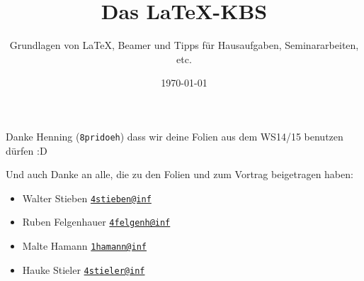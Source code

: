 \documentclass{beamer}
\title{Das \LaTeX-KBS}
\subtitle{\small Grundlagen von \LaTeX, Beamer und Tipps für Hausaufgaben, Seminararbeiten, etc.}
\date{\footnotesize \today}
\begin{document}
	\maketitle
		
		
	\begin{frame}
		\begin{center}
			Danke Henning (\texttt{8pridoeh}) dass wir deine Folien aus dem WS14/15 benutzen dürfen :D
		\end{center}
		Und auch Danke an alle, die zu den Folien und zum Vortrag beigetragen haben:
		\begin{itemize}
			\item Walter Stieben \texttt{\href{mailto:4stieben@informatik.uni-hamburg.de}{4stieben@inf}}\\
			\item Ruben Felgenhauer \texttt{\href{mailto:4felgenh@informatik.uni-hamburg.de}{4felgenh@inf}}\\
			\item Malte Hamann \texttt{\href{mailto:1hamann@informatik.uni-hamburg.de}{1hamann@inf}}\\
			\item Hauke Stieler \texttt{\href{mailto:4stieler@informatik.uni-hamburg.de}{4stieler@inf}}
		\end{itemize}
	\end{frame}
		
		
\end{document}
